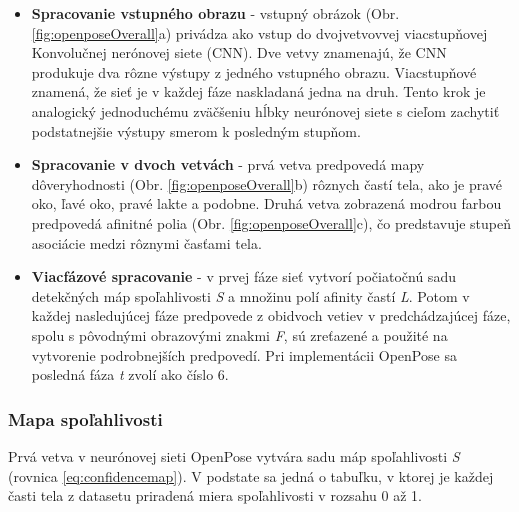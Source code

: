 \documentclass[slovak,master,dept460,male,cpp,cpdeclaration]{diploma}
\begin{document}
\begin{itemize}
\item \textbf{Spracovanie vstupného obrazu} - vstupný obrázok (Obr. \ref{fig:openposeOverall}a) privádza ako vstup do dvojvetvovvej viacstupňovej Konvolučnej nerónovej siete (CNN). Dve vetvy znamenajú, že CNN produkuje dva rôzne výstupy z jedného vstupného obrazu. Viacstupňové znamená, že sieť je v každej fáze naskladaná jedna na druh. Tento krok je analogický jednoduchému zväčšeniu hĺbky neurónovej siete s cieľom zachytiť podstatnejšie výstupy smerom k posledným stupňom.

\item \textbf{Spracovanie v dvoch vetvách} - prvá vetva predpovedá mapy dôveryhodnosti (Obr. \ref{fig:openposeOverall}b) rôznych častí tela, ako je pravé oko, ľavé oko, pravé lakte a podobne. Druhá vetva zobrazená modrou farbou predpovedá afinitné polia (Obr. \ref{fig:openposeOverall}c), čo predstavuje stupeň asociácie medzi rôznymi časťami tela.

\item \textbf{Viacfázové spracovanie} - v prvej fáze sieť vytvorí počiatočnú sadu detekčných máp spoľahlivosti \textit{S} a množinu polí afinity častí \textit{L}. Potom v každej nasledujúcej fáze predpovede z obidvoch vetiev v predchádzajúcej fáze, spolu s pôvodnými obrazovými znakmi \textit{F}, sú zreťazené a použité na vytvorenie podrobnejších predpovedí. Pri implementácii OpenPose sa posledná fáza \textit{t} zvolí ako číslo 6.
\end{itemize}

\subsubsection{Mapa spoľahlivosti}
Prvá vetva v neurónovej sieti OpenPose vytvára sadu máp spoľahlivosti \textit{S} (rovnica \ref{eq:confidencemap}). V podstate sa jedná o tabuľku, v ktorej je každej časti tela z datasetu priradená miera spoľahlivosti v rozsahu 0 až 1. 
\end{document}
